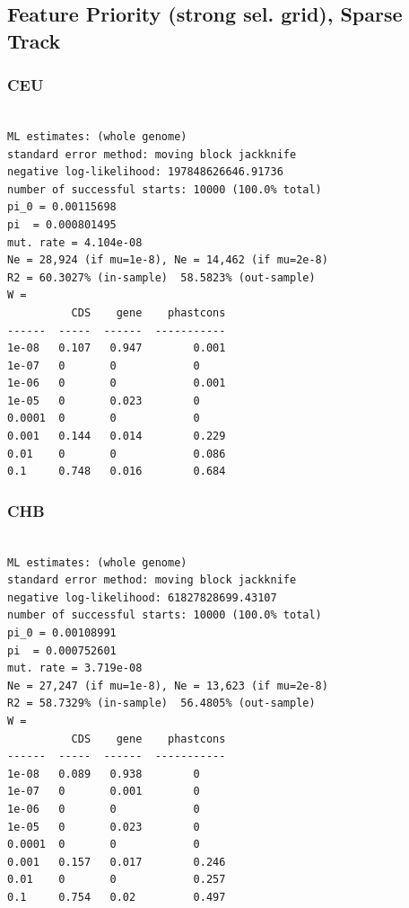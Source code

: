 \documentclass[11pt]{article}
\begin{document}
\subsection{Feature Priority (strong sel. grid), Sparse Track}
\subsubsection*{CEU}
\begin{minipage}{\linewidth}\begin{footnotesize}
\begin{verbatim}

ML estimates: (whole genome)
standard error method: moving block jackknife
negative log-likelihood: 197848626646.91736
number of successful starts: 10000 (100.0% total)
pi_0 = 0.00115698
pi  = 0.000801495
mut. rate = 4.104e-08 
Ne = 28,924 (if mu=1e-8), Ne = 14,462 (if mu=2e-8)
R2 = 60.3027% (in-sample)  58.5823% (out-sample)
W = 
          CDS    gene    phastcons
------  -----  ------  -----------
1e-08   0.107   0.947        0.001
1e-07   0       0            0
1e-06   0       0            0.001
1e-05   0       0.023        0
0.0001  0       0            0
0.001   0.144   0.014        0.229
0.01    0       0            0.086
0.1     0.748   0.016        0.684
\end{verbatim}
\end{footnotesize}\end{minipage}


\subsubsection*{CHB}
\begin{minipage}{\linewidth}\begin{footnotesize}
\begin{verbatim}

ML estimates: (whole genome)
standard error method: moving block jackknife
negative log-likelihood: 61827828699.43107
number of successful starts: 10000 (100.0% total)
pi_0 = 0.00108991
pi  = 0.000752601
mut. rate = 3.719e-08 
Ne = 27,247 (if mu=1e-8), Ne = 13,623 (if mu=2e-8)
R2 = 58.7329% (in-sample)  56.4805% (out-sample)
W = 
          CDS    gene    phastcons
------  -----  ------  -----------
1e-08   0.089   0.938        0
1e-07   0       0.001        0
1e-06   0       0            0
1e-05   0       0.023        0
0.0001  0       0            0
0.001   0.157   0.017        0.246
0.01    0       0            0.257
0.1     0.754   0.02         0.497
\end{verbatim}
\end{footnotesize}\end{minipage}
\end{document}
